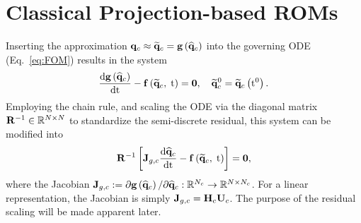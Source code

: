 \section{Classical Projection-based ROMs}\label{sec:classicROMs}

Inserting the approximation $\mathbf{q}_{c} \approx \mathbf{\widetilde{q}}_{c} = \mathbf{g} \left(\mathbf{\widehat{q}}_{c}\right)$ into the governing ODE (Eq.~\ref{eq:FOM}) results in the system
%
\begin{equation}\label{eq:romFullODE}
    \frac{\text{d} \mathbf{g} \left(\mathbf{\widehat{q}}_{c}\right)}{\text{d} \text{t}} - \mathbf{f} \left(\mathbf{\widetilde{q}}_{c}, \; \text{t}\right) = \mathbf{0}, \quad \mathbf{\widetilde{q}}_{c}^0 = \mathbf{\widetilde{q}}_{c} \left(\text{t}^0\right).
\end{equation}
%
Employing the chain rule, and scaling the ODE via the diagonal matrix $\resScaleInv \inRTwo{\numDOF}{\numDOF}$ to standardize the semi-discrete residual, this system can be modified into
%
\begin{equation}\label{eq:romFullODEMod}
    \resScaleInv \left[ \jacobDecodeCons \ode{\consVecCoef}{\timeVar} - \rhsFunc{\consVecRom, \; \timeVar} \right] = \zeroVec,
\end{equation}
%
where the Jacobian $\mathbf{J}_{g,c} := \partial \mathbf{g} \left(\mathbf{\widehat{q}}_{c}\right) / \partial \mathbf{\widehat{q}}_{c}: \mathbb{R}^{N_c} \rightarrow \mathbb{R}^{N \times N_c}$. For a linear representation, the Jacobian is simply $\jacobDecodeCons = \consScale \consTrial$. The purpose of the residual scaling will be made apparent later.

